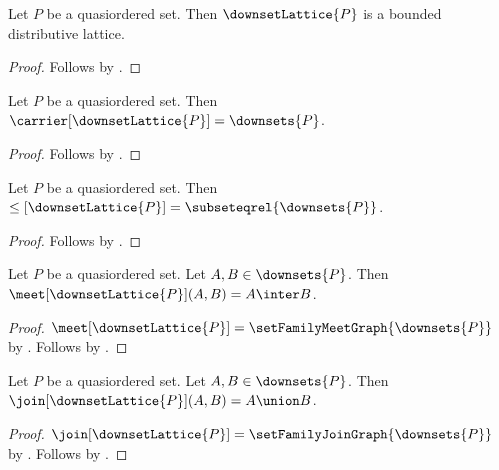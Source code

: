 \begin{classification}\label{downset_lattice_is_bounded_distributive_lattice}
    Let $P$ be a quasiordered set.
    Then $\downsetLattice{P}$ is a bounded distributive lattice.
\end{classification}
\begin{proof}
    Follows by
        .
\end{proof}

\begin{proposition}\label{downset_lattice_carrier}
    Let $P$ be a quasiordered set.
    Then $\carrier[\downsetLattice{P}]=\downsets{P}$.
\end{proposition}
\begin{proof}
    Follows by
        .
\end{proof}

\begin{proposition}\label{downset_lattice_order}
    Let $P$ be a quasiordered set.
    Then $\leq[\downsetLattice{P}]=\subseteqrel{\downsets{P}}$.
\end{proposition}
\begin{proof}
    Follows by
        .
\end{proof}

\begin{proposition}\label{downset_lattice_meet}
    Let $P$ be a quasiordered set.
    Let $A,B\in\downsets{P}$.
    Then $\meet[\downsetLattice{P}](A,B)=A\inter B$.
\end{proposition}
\begin{proof}
    $\meet[\downsetLattice{P}]
        =\setFamilyMeetGraph{\downsets{P}}$ by
        .
    Follows by .
\end{proof}

\begin{proposition}\label{downset_lattice_join}
    Let $P$ be a quasiordered set.
    Let $A,B\in\downsets{P}$.
    Then $\join[\downsetLattice{P}](A,B)=A\union B$.
\end{proposition}
\begin{proof}
    $\join[\downsetLattice{P}]
        =\setFamilyJoinGraph{\downsets{P}}$ by
        .
    Follows by .
\end{proof}

